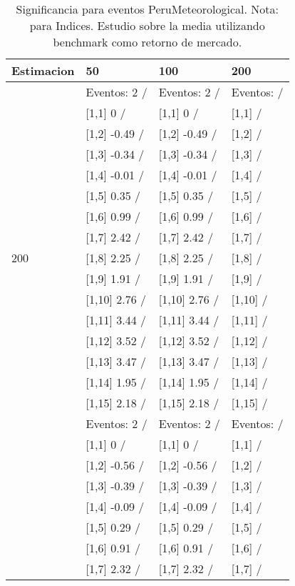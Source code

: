 \begin{table}

\caption{Significancia para eventos PeruMeteorological. Nota: para Indices. Estudio sobre la media utilizando benchmark como retorno de mercado.}
\centering
\begin{tabular}[t]{llll}
\toprule
Estimacion & 50 & 100 & 200\\
\midrule
 & Eventos:  2 / & Eventos:  2 / & Eventos:   /\\
 & {}[1,1] 0  / & {}[1,1] 0  / & {}[1,1]  /\\
 & {}[1,2] -0.49  / & {}[1,2] -0.49  / & {}[1,2]  /\\
 & {}[1,3] -0.34  / & {}[1,3] -0.34  / & {}[1,3]  /\\
 & {}[1,4] -0.01  / & {}[1,4] -0.01  / & {}[1,4]  /\\
\addlinespace
 & {}[1,5] 0.35  / & {}[1,5] 0.35  / & {}[1,5]  /\\
 & {}[1,6] 0.99  / & {}[1,6] 0.99  / & {}[1,6]  /\\
 & {}[1,7] 2.42  / & {}[1,7] 2.42  / & {}[1,7]  /\\
200 & {}[1,8] 2.25  / & {}[1,8] 2.25  / & {}[1,8]  /\\
 & {}[1,9] 1.91  / & {}[1,9] 1.91  / & {}[1,9]  /\\
\addlinespace
 & {}[1,10] 2.76  / & {}[1,10] 2.76  / & {}[1,10]  /\\
 & {}[1,11] 3.44  / & {}[1,11] 3.44  / & {}[1,11]  /\\
 & {}[1,12] 3.52  / & {}[1,12] 3.52  / & {}[1,12]  /\\
 & {}[1,13] 3.47  / & {}[1,13] 3.47  / & {}[1,13]  /\\
 & {}[1,14] 1.95  / & {}[1,14] 1.95  / & {}[1,14]  /\\
\addlinespace
 & {}[1,15] 2.18  / & {}[1,15] 2.18  / & {}[1,15]  /\\
 & Eventos:  2 / & Eventos:  2 / & Eventos:   /\\
 & {}[1,1] 0  / & {}[1,1] 0  / & {}[1,1]  /\\
 & {}[1,2] -0.56  / & {}[1,2] -0.56  / & {}[1,2]  /\\
 & {}[1,3] -0.39  / & {}[1,3] -0.39  / & {}[1,3]  /\\
\addlinespace
 & {}[1,4] -0.09  / & {}[1,4] -0.09  / & {}[1,4]  /\\
 & {}[1,5] 0.29  / & {}[1,5] 0.29  / & {}[1,5]  /\\
 & {}[1,6] 0.91  / & {}[1,6] 0.91  / & {}[1,6]  /\\
 & {}[1,7] 2.32  / & {}[1,7] 2.32  / & {}[1,7]  /\\

\end{tabular}
\end{table}
